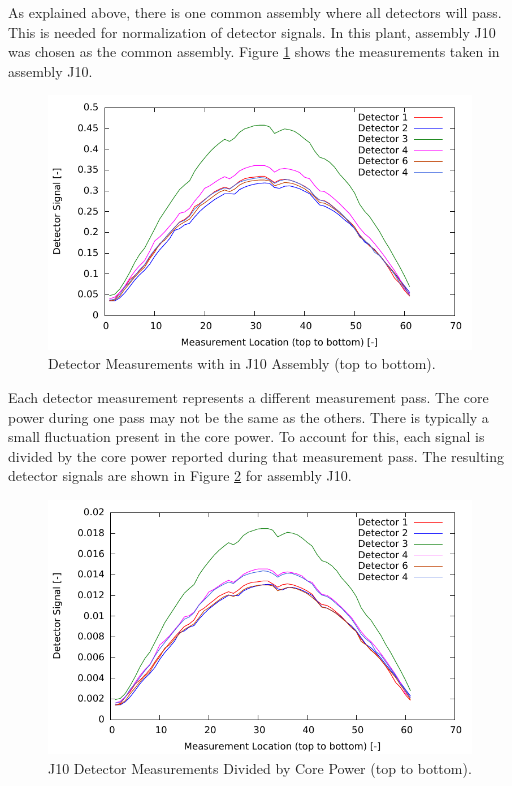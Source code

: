 As explained above, there is one common assembly where all detectors will pass. This is needed 
for normalization of detector signals. In this plant, assembly J10 was chosen as the common
assembly.  Figure \ref{fig:J10} shows the measurements taken in assembly J10.
\begin{figure}
    \centering
    \includegraphics{expdata/figs/zeros.pdf}
    \caption{Detector Measurements with in J10 Assembly (top to bottom). \label{fig:J10}}
\end{figure}

Each detector measurement represents a different measurement pass.  The core power
during one pass may not be the same as the others. There is typically a small fluctuation present in the core power. To account for this, each signal
is divided by the core power reported during that measurement pass. The resulting
detector signals are shown in Figure \ref{fig:dividepower} for assembly J10.
\begin{figure}[htbp]
    \centering
    \includegraphics{expdata/figs/divide_power.pdf}
    \caption{J10 Detector Measurements Divided by Core Power (top to bottom). \label{fig:dividepower}}
\end{figure}

